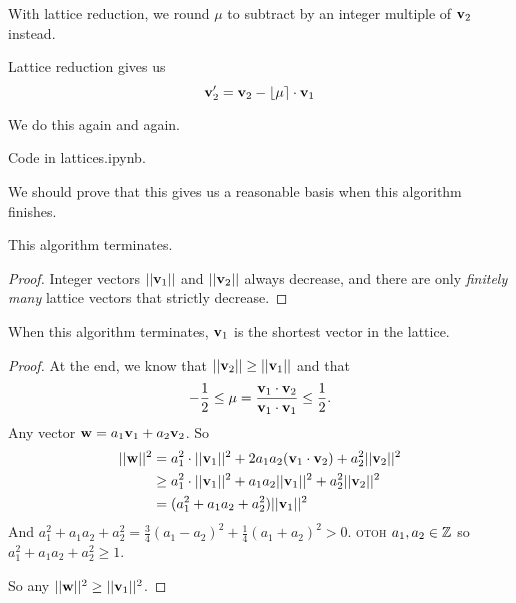 With lattice reduction, we round $\mu$ to subtract by an integer multiple of $\mathbf{v}_2$ instead.

\begin{center}
\end{center}

Lattice reduction gives us
\[\mathbf{v}_2' = \mathbf{v}_2 - \lfloor\mu\rceil\cdot \mathbf{v}_1\]

We do this again and again.

Code in \textsf{lattices.ipynb}.

We should prove that this gives us a reasonable basis when this algorithm finishes.
\begin{proposition}
    This algorithm terminates.
\end{proposition}
\begin{proof}
    Integer vectors $||\mathbf{v}_1||$ and $||\mathbf{v}_2||$ always decrease, and there are only \emph{finitely many} lattice vectors that strictly decrease.
\end{proof}

\begin{proposition}
    When this algorithm terminates, $\mathbf{v}_1$ is the shortest vector in the lattice.
\end{proposition}
\begin{proof}
    At the end, we know that $||\mathbf{v}_2||\geq ||\mathbf{v}_1||$ and that
    \[-\frac{1}{2}\leq \mu = \frac{\mathbf{v}_1\cdot \mathbf{v}_2}{\mathbf{v}_1\cdot \mathbf{v}_1} \leq \frac{1}{2}.\]
    Any vector $\mathbf{w} = a_1\mathbf{v}_1 + a_2\mathbf{v}_2$. So
    \begin{align*}
        ||\mathbf{w}||^2 & = a_1^2\cdot ||\mathbf{v}_1||^2 + 2a_1a_2(\mathbf{v}_1\cdot \mathbf{v}_2) + a_2^2||\mathbf{v}_2||^2 \\
                       & \geq a_1^2\cdot ||\mathbf{v}_1||^2 + a_1a_2||\mathbf{v}_1||^2 + a_2^2||\mathbf{v}_2||^2           \\
                       & = (a_1^2 + a_1a_2 + a_2^2)||\mathbf{v}_1||^2
    \end{align*}
    And $a_1^2 + a_1a_2 + a_2^2 = \frac{3}{4}(a_1 - a_2)^2 + \frac{1}{4}(a_1 + a_2)^2 > 0$. \textsc{otoh} $a_1, a_2\in\mathbb Z$ so $a_1^2 + a_1a_2 + a_2^2\geq 1$.

    So any $||\mathbf{w}||^2 \geq ||\mathbf{v}_1||^2$.
\end{proof}